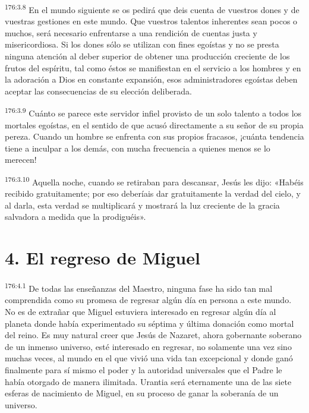 \par 
\textsuperscript{176:3.8} En el mundo siguiente se os pedirá que deis cuenta de vuestros dones y de vuestras gestiones en este mundo. Que vuestros talentos inherentes sean pocos o muchos, será necesario enfrentarse a una rendición de cuentas justa y misericordiosa. Si los dones sólo se utilizan con fines egoístas y no se presta ninguna atención al deber superior de obtener una producción creciente de los frutos del espíritu, tal como éstos se manifiestan en el servicio a los hombres y en la adoración a Dios en constante expansión, esos administradores egoístas deben aceptar las consecuencias de su elección deliberada.

\par 
\textsuperscript{176:3.9} Cuánto se parece este servidor infiel provisto de un solo talento a todos los mortales egoístas, en el sentido de que acusó directamente a su señor de su propia pereza. Cuando un hombre se enfrenta con sus propios fracasos, ¡cuánta tendencia tiene a inculpar a los demás, con mucha frecuencia a quienes menos se lo merecen!

\par 
\textsuperscript{176:3.10} Aquella noche, cuando se retiraban para descansar, Jesús les dijo: «Habéis recibido gratuitamente; por eso deberíais dar gratuitamente la verdad del cielo, y al darla, esta verdad se multiplicará y mostrará la luz creciente de la gracia salvadora a medida que la prodiguéis».

\section*{4. El regreso de Miguel}
\par 
\textsuperscript{176:4.1} De todas las enseñanzas del Maestro, ninguna fase ha sido tan mal comprendida como su promesa de regresar algún día en persona a este mundo. No es de extrañar que Miguel estuviera interesado en regresar algún día al planeta donde había experimentado su séptima y última donación como mortal del reino. Es muy natural creer que Jesús de Nazaret, ahora gobernante soberano de un inmenso universo, esté interesado en regresar, no solamente una vez sino muchas veces, al mundo en el que vivió una vida tan excepcional y donde ganó finalmente para sí mismo el poder y la autoridad universales que el Padre le había otorgado de manera ilimitada. Urantia será eternamente una de las siete esferas de nacimiento de Miguel, en su proceso de ganar la soberanía de un universo.

